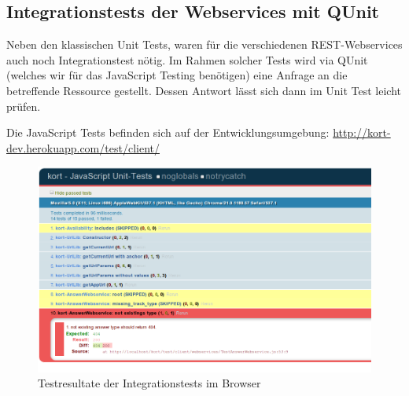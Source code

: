 \subsection{Integrationstests der Webservices mit QUnit}
Neben den klassischen Unit Tests, waren für die verschiedenen \gls{REST}-Webservices auch noch Integrationstest nötig.
Im Rahmen solcher Tests wird via QUnit (welches wir für das JavaScript Testing benötigen) eine Anfrage an die betreffende Ressource gestellt.
Dessen Antwort lässt sich dann im Unit Test leicht prüfen.

Die JavaScript Tests befinden sich auf der Entwicklungsumgebung: \url{http://kort-dev.herokuapp.com/test/client/}

\begin{figure}[H]
	\centering
	\includegraphics[width=\textwidth]{images/implementation/backend/qunit-skipped-test}
	\caption{Testresultate der Integrationstests im Browser}
	\label{image-qunit-skipped-test}
\end{figure}